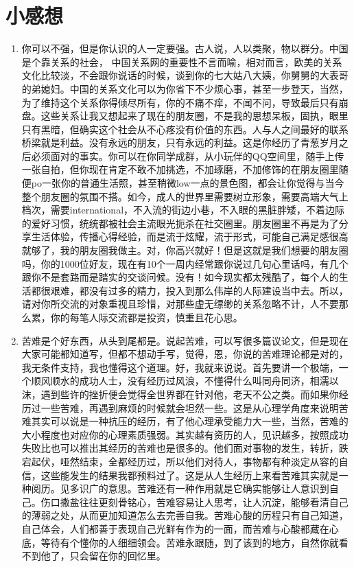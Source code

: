 \documentclass[color=green,mathpazo,titlestyle=hang]{elegantbook}
\begin{document}
\section{小感想}
\begin{enumerate}
	\item {\color{main}你可以不强，但是你认识的人一定要强。}古人说，人以类聚，物以群分。中国是个靠关系的社会， 中国关系网的重要性不言而喻，相对而言，欧美的关系文化比较淡，不会跟你说话的时候，谈到你的七大姑八大姨，你舅舅的大表哥的弟媳妇。中国的关系文化可以为你省下不少烦心事，甚至一步登天，当然，为了维持这个关系你得倾尽所有，你的不痛不痒，不闻不问，导致最后只有崩盘。这些关系让我又想起来了现在的朋友圈，不是我的思想呆板，固执，眼里只有黑暗，但确实这个社会从不心疼没有价值的东西。人与人之间最好的联系桥梁就是利益。没有永远的朋友，只有永远的利益。这是你经历了青葱岁月之后必须面对的事实。你可以在你同学成群，从小玩伴的QQ空间里，随手上传一张自拍，但你现在肯定不敢不加挑选，不加琢磨，不加修饰的在朋友圈里随便po一张你的普通生活照，甚至稍微low一点的景色图，都会让你觉得与当今整个朋友圈的氛围不搭。如今，成人的世界里需要树立形象，需要高端大气上档次，需要international，不入流的街边小巷，不入眼的黑脏胖矮，不着边际的爱好习惯，统统都被社会主流眼光扼杀在社交圈里。朋友圈里不再是为了分享生活体验，传播心得经验，而是流于炫耀，流于形式，可能自己满足感很高就够了，我的朋友圈我做主。对，你高兴就好！但是这就是我们想要的朋友圈吗，你的1000位好友，现在有10个一周内经常跟你说过几句心里话吗，有几个跟你不是套路而是踏实的交谈问候。没有！如今现实都太残酷了，每个人的生活都很艰难，都没有过多的精力，投入到那么伟岸的人际建设当中去。{\color{main}所以，请对你所交流的对象重视且珍惜，对那些虚无缥缈的关系忽略不计，人不要那么累，你的每笔人际交流都是投资，慎重且花心思。}
	\item  {\color{main}苦难是个好东西，从头到尾都是。}说起苦难，可以写很多篇议论文，但是现在大家可能都知道写，但都不想动手写，觉得，恩，你说的苦难理论都是对的，我无条件支持，我也懂得这个道理。好，我就来说说。首先要讲一个极端，一个顺风顺水的成功人士，没有经历过风浪，不懂得什么叫同舟同济，相濡以沫，遇到些许的挫折便会觉得全世界都在针对他，老天不公之类。而如果你经历过一些苦难，再遇到麻烦的时候就会坦然一些。这是从心理学角度来说明苦难其实可以说是一种抗压的经历，有了他心理承受能力大一些，当然，苦难的大小程度也对应你的心理素质强弱。其实越有资历的人，见识越多，按照成功失败比也可以推出其经历的苦难也是很多的。他们面对事物的发生，转折，跌宕起伏，哑然结束，全都经历过，所以他们对待人，事物都有种淡定从容的自信，这些能发生的结果我都预料过了。这是从人生经历上来看苦难其实就是一种阅历。见多识广的意思。苦难还有一种作用就是它确实能够让人意识到自己。伤口撒盐往往更刻骨铭心，苦难容易让人思考，让人沉淀，能够看清自己的薄弱之处，从而更加知道怎么去完善自我。苦难心酸的历程只有自己知道，自己体会，人们都善于表现自己光鲜有作为的一面，而苦难与心酸都藏在心底，等待有个懂你的人细细领会。苦难永跟随，到了该到的地方，自然你就看不到他了，只会留在你的回忆里。

\end{enumerate}
\end{document}
